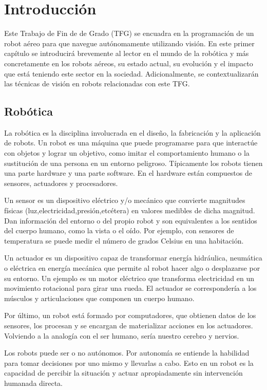 \chapter{Introducción}\label{cap:Intro}

Este Trabajo de Fin de de Grado (TFG) se encuadra en la programación de un robot aéreo para que navegue autónomamente utilizando visión. En este primer capítulo se introducirá brevemente al lector en el mundo de la robótica y más concretamente en los robots aéreos, su estado actual, su evolución y el impacto que está teniendo este sector en la sociedad. Adicionalmente, se contextualizarán las técnicas de visión en robots relacionadas con este TFG.

\section{Robótica}\label{SEC:Robotica}

La robótica es la disciplina involucrada en el diseño, la fabricación y la aplicación de robots. Un robot es una máquina que puede programarse para que interactúe con objetos y lograr un objetivo, como imitar el comportamiento humano o la sustitución de una persona en un entorno peligroso. Típicamente los robots tienen una parte hardware y una parte software. En el hardware están compuestos de sensores, actuadores y procesadores.

Un sensor es un dispositivo eléctrico y/o mecánico que convierte magnitudes físicas (luz,electricidad,presión,etcétera) en valores medibles de dicha magnitud. Dan información del entorno o del propio robot y son equivalentes a los sentidos del cuerpo humano, como la vista o el oído. Por ejemplo, con sensores de temperatura se puede medir el número de grados Celsius en una habitación.

Un actuador es un dispositivo capaz de transformar energía hidráulica, neumática o eléctrica en energía mecánica que permite al robot hacer algo o desplazarse por su entorno. Un ejemplo es un motor eléctrico que transforma electricidad en un movimiento rotacional para girar una rueda. El actuador se correspondería a los músculos y articulaciones que componen un cuerpo humano.

Por último, un robot está formado por computadores, que obtienen datos de los sensores, los procesan y se encargan de materializar acciones en los actuadores. Volviendo a la analogía con el ser humano, sería nuestro cerebro y nervios.

Los robots puede ser o no autónomos. Por autonomía se entiende la habilidad para tomar decisiones por uno mismo y llevarlas a cabo. Esto en un robot es la capacidad de percibir la situación y actuar apropiadamente sin intervención humanada directa.


